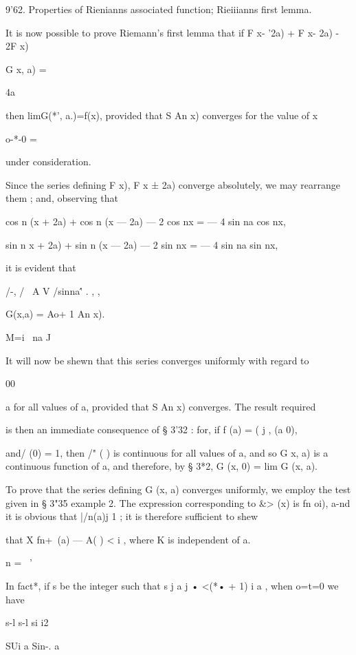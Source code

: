 9'62. Properties of Rienianns associated function; Rieiiianns first
lemma.

It is now possible to prove Riemann's first lemma that if F x- '2a) +
F x- 2a) - 2F x)



G x, a) =



4a



then limG(*', a.)=f(x), provided that S An x) converges for the value
of x

o-*-0 =

under consideration.

Since the series defining F x), F x ± 2a) converge absolutely, we may
rearrange them ; and, observing that

cos n (x + 2a) + cos n (x — 2a) — 2 cos nx = — 4 sin na cos nx,

sin n x + 2a) + sin n (x — 2a) — 2 sin nx = — 4 sin na sin nx,

it is evident that

/-, / \ A V /sinna\'' . , ,

G(x,a) = Ao+ 1 An x).

M=i \ na J

It will now be shewn that this series converges uniformly with regard
to

00

a for all values of a, provided that S An x) converges. The result
required

is then an immediate consequence of § 3'32 : for, if f (a) = ( j , (a
0),

and/ (0) = 1, then /" ( ) is continuous for all values of a, and so G
x, a) is a continuous function of a, and therefore, by § 3*2, G (x, 0)
= lim G (x, a).

To prove that the series defining G (x, a) converges uniformly, we
employ the test given in § 3"35 example 2. The expression
corresponding to \&> (x) is fn oi), a-nd it is obvious that |/n(a)j 1
; it is therefore sufficient to shew

that X fn+\ (a) — A( ) < i , where K is independent of a.

n = \ '

In fact*, if s be the integer such that s j a j • <(*• + 1) i a , when
o=t=0 we have



s-l s-l si i2



SUi a Sin-. a



